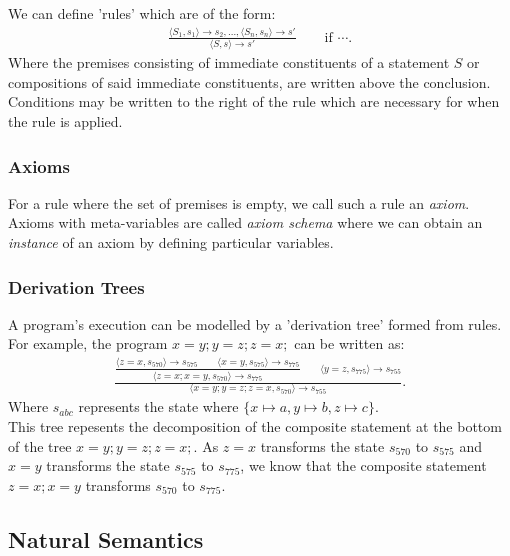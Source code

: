 \documentclass[a4paper, 12pt, twoside]{article}
\begin{document}
We can define 'rules' which are of the form: \begin{gather*}
  \frac{
    \langle S_1, s_1 \rangle \to s_2, \ldots, \langle S_n, s_n \rangle \to s'
  }{
    \langle S, s \rangle \to s'
  } \qquad \text{if } \cdots.
\end{gather*} Where the premises consisting of immediate constituents 
of a statement $S$ or compositions of said immediate constituents, 
are written above the conclusion. Conditions may be written to the right
of the rule which are necessary for when the rule is applied.

\subsubsection{Axioms}

For a rule where the set of premises is empty, we call 
such a rule an \textit{axiom}. Axioms with meta-variables
are called \textit{axiom schema} where we can obtain an
\textit{instance} of an axiom by defining particular
variables.

\subsubsection{Derivation Trees}

A program's execution can be modelled by a 'derivation tree'
formed from rules.
For example, the program $x=y;y=z;z=x;$ can be written as:
\begin{gather*}
  \frac{\dfrac{
    \langle z=x, s_{570} \rangle \to s_{575} 
    \qquad \langle x=y, s_{575} \rangle \to s_{775}
  }{\langle z=x;x=y, s_{570} \rangle \to s_{775}}
  \qquad \langle y=z, s_{775} \rangle \to s_{755}}
  {\langle x=y;y=z;z=x, s_{570} \rangle \to s_{755}}.
\end{gather*} Where $s_{abc}$ represents the state where 
$\{x \mapsto a, y \mapsto b, z \mapsto c\}$.
\\[\baselineskip]
This tree repesents the decomposition of the composite statement
at the bottom of the tree $x=y;y=z;z=x;$. As $z=x$ transforms
the state $s_{570}$ to $s_{575}$ and $x=y$ transforms the state
$s_{575}$ to $s_{775}$, we know that the composite statement
$z=x;x=y$ transforms $s_{570}$ to $s_{775}$.

\subsection{Natural Semantics}
\end{document}
